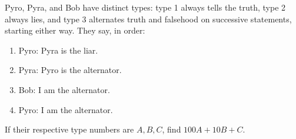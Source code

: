 Pyro, Pyra, and Bob have distinct types: type 1 always tells the truth, type 2 always lies, and type 3 alternates truth and falsehood on successive statements, starting either way. They say, in order:
\begin{enumerate}
\item Pyro: Pyra is the liar.
\item Pyra: Pyro is the alternator.
\item Bob: I am the alternator.
\item Pyro: I am the alternator.
\end{enumerate}
If their respective type numbers are $A,B,C$, find $100A+10B+C$.
